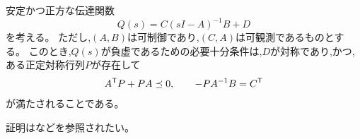 \documentclass[graybox, envcountchap]{svmult}
\begin{document}
\begin{補題}\label{lem:nilem}
安定かつ正方な伝達関数
\[
Q(s)=C(sI-A)^{-1}B + D
\]
を考える。
ただし,$(A,B)$は可制御であり,$(C,A)$は可観測であるものとする。
このとき,$Q(s)$が負虚であるための必要十分条件は,$D$が対称であり,かつ,
ある正定対称行列$P$が存在して
\begin{align*}
A^{\sf T}P+PA \preceq 0
,\qquad
-PA^{-1}B = C^{\sf T}
\end{align*}
が満たされることである。
\end{補題}

証明は\cite[Lemma 7]{xiong2010negative}などを参照されたい。
\end{document}
